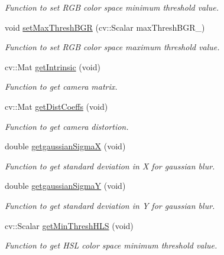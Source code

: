 \begin{DoxyCompactItemize}
\begin{DoxyCompactList}\small\item\em Function to set R\+GB color space minimum threshold value. \end{DoxyCompactList}\item 
void \hyperlink{classImageProcessing_ac11c15a2cbdbf71c6d6b1f10a768e4c2}{set\+Max\+Thresh\+B\+GR} (cv\+::\+Scalar max\+Thresh\+B\+G\+R\+\_\+)
\begin{DoxyCompactList}\small\item\em Function to set R\+GB color space maximum threshold value. \end{DoxyCompactList}\item 
cv\+::\+Mat \hyperlink{classImageProcessing_a3f38ff39191c4bec62e5ce03b5e72423}{get\+Intrinsic} (void)
\begin{DoxyCompactList}\small\item\em Function to get camera matrix. \end{DoxyCompactList}\item 
cv\+::\+Mat \hyperlink{classImageProcessing_a07b25ad0e2f707d451dd2cd905739c6d}{get\+Dist\+Coeffs} (void)
\begin{DoxyCompactList}\small\item\em Function to get camera distortion. \end{DoxyCompactList}\item 
double \hyperlink{classImageProcessing_aa0879ca32fc15e72d781723eb33de32e}{getgaussian\+SigmaX} (void)
\begin{DoxyCompactList}\small\item\em Function to get standard deviation in X for gaussian blur. \end{DoxyCompactList}\item 
double \hyperlink{classImageProcessing_a597f35362caec714d90e6a23be0db39c}{getgaussian\+SigmaY} (void)
\begin{DoxyCompactList}\small\item\em Function to get standard deviation in Y for gaussian blur. \end{DoxyCompactList}\item 
cv\+::\+Scalar \hyperlink{classImageProcessing_a08af88927411e7184e2efcebbf00ebf6}{get\+Min\+Thresh\+H\+LS} (void)
\begin{DoxyCompactList}\small\item\em Function to get H\+SL color space minimum threshold value. \end{DoxyCompactList}\item 

\end{DoxyCompactItemize}
